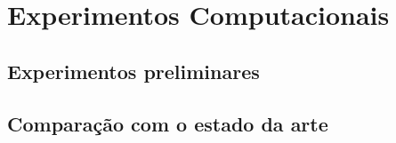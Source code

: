 \chapter{Experimentos Computacionais} \label{experimentos}

\section{Experimentos preliminares}

\section{Comparação com o estado da arte}
